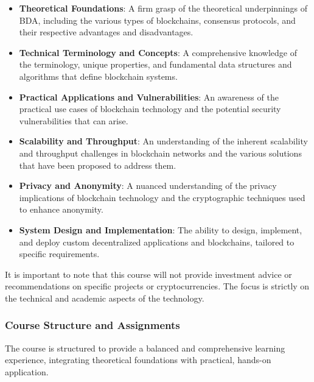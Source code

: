 \begin{itemize}
	\tightlist
	\item
	\textbf{Theoretical Foundations}: A firm grasp of the theoretical
	underpinnings of BDA, including the various types of blockchains,
	consensus protocols, and their respective advantages and
	disadvantages.
	\item
	\textbf{Technical Terminology and Concepts}: A comprehensive knowledge
	of the terminology, unique properties, and fundamental data structures
	and algorithms that define blockchain systems.
	\item
	\textbf{Practical Applications and Vulnerabilities}: An awareness of
	the practical use cases of blockchain technology and the potential
	security vulnerabilities that can arise.
	\item
	\textbf{Scalability and Throughput}: An understanding of the inherent
	scalability and throughput challenges in blockchain networks and the
	various solutions that have been proposed to address them.
	\item
	\textbf{Privacy and Anonymity}: A nuanced understanding of the privacy
	implications of blockchain technology and the cryptographic techniques
	used to enhance anonymity.
	\item
	\textbf{System Design and Implementation}: The ability to design,
	implement, and deploy custom decentralized applications and
	blockchains, tailored to specific requirements.
\end{itemize}

It is important to note that this course will not provide investment
advice or recommendations on specific projects or cryptocurrencies. The
focus is strictly on the technical and academic aspects of the
technology.

\subsubsection{Course Structure and
	Assignments}\label{course-structure-and-assignments}

The course is structured to provide a balanced and comprehensive
learning experience, integrating theoretical foundations with practical,
hands-on application.

